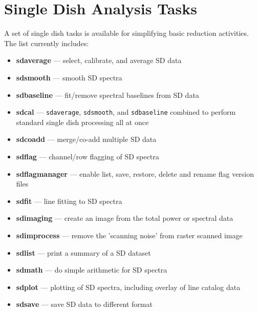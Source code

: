 \section{Single Dish Analysis Tasks}
\label{section:sd.sdtasks}

A set of single dish tasks is available for simplifying basic
reduction activities.  The list currently includes:

\begin{itemize}

\item {\bf sdaverage} --- select, calibrate, and average SD data

\item {\bf sdsmooth} --- smooth SD spectra

\item {\bf sdbaseline} --- fit/remove spectral baselines from SD data

\item {\bf sdcal} --- {\tt sdaverage}, {\tt sdsmooth}, and {\tt sdbaseline} combined to perform standard single dish processing all at once 

\item {\bf sdcoadd} --- merge/co-add multiple SD data

\item {\bf sdflag} --- channel/row flagging of SD spectra

\item {\bf sdflagmanager} --- enable list, save, restore, delete and rename flag version files

\item {\bf sdfit} --- line fitting to SD spectra

\item {\bf sdimaging} --- create an image from the total power or spectral data

\item{\bf sdimprocess} --- remove the 'scanning noise' from raster scanned image  

\item {\bf sdlist} --- print a summary of a SD dataset

\item {\bf sdmath} --- do simple arithmetic for SD spectra 

\item {\bf sdplot} --- plotting of SD spectra, including overlay of line
catalog data

\item {\bf sdsave} --- save SD data to different format


\end{itemize}
